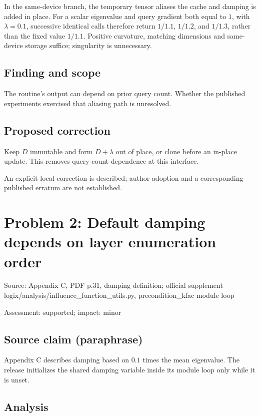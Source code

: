 \documentclass[11pt]{article}
\begin{document}
In the same-device branch, the temporary tensor aliases the cache and damping is added in place. For a scalar eigenvalue and query gradient both equal to \(1\), with \(\lambda=0.1\), successive identical calls therefore return \(1/1.1\), \(1/1.2\), and \(1/1.3\), rather than the fixed value \(1/1.1\). Positive curvature, matching dimensions and same-device storage suffice; singularity is unnecessary.

\subsection*{Finding and scope}

The routine’s output can depend on prior query count. Whether the published experiments exercised that aliasing path is unresolved.

\subsection*{Proposed correction}

Keep \(D\) immutable and form \(D+\lambda\) out of place, or clone before an in-place update. This removes query-count dependence at this interface.

An explicit local correction is described; author adoption and a corresponding published erratum are not established.

\section*{Problem 2: Default damping depends on layer enumeration order}

Source: Appendix C, PDF p.31, damping definition; official supplement logix/analysis/influence\_function\_utils.py, precondition\_kfac module loop

Assessment: supported; impact: minor

\subsection*{Source claim (paraphrase)}

Appendix C describes damping based on \(0.1\) times the mean eigenvalue. The release initializes the shared damping variable inside its module loop only while it is unset.

\subsection*{Analysis}
\end{document}
